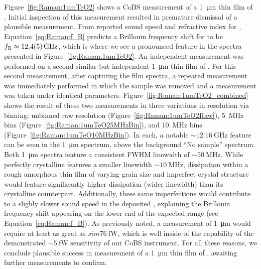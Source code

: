Figure~\ref{fig:Raman:1umTeO2} shows a \ac{CoBS} measurement of a \SI{1}{\micro\meter} thin film of . Initial inspection of this measurement resulted in premature dismissal of a plausible measurement. From reported sound speed and refractive index for , \cite{uchida1969elastic, schweppe1970elastic, ohmachi1972acoustic, peercy1975temperature, fleury2018non, harris1991multichannel, uchida1971optical} Equation~\ref{eq:Raman:f_B} predicts a Brillouin frequency shift for  to be \(f_{\rm B}\approx\SI{12.4(0.5)}{\giga\hertz}\), which is where we see a pronounced feature in the spectra presented in Figure~\ref{fig:Raman:1umTeO2}. An independent measurement was performed on a second similar but independent \SI{1}{\micro\meter} thin film of . For this second measurement, after capturing the  film spectra, a repeated measurement was immediately performed in which the  sample was removed and a measurement was taken under identical parameters. Figure~\ref{fig:Raman:1umTeO2_combined} shows the result of these two measurements in three variations in resolution via binning: unbinned raw resolution (Figure~\ref{fig:Raman:1umTeO2Raw}), \SI{5}{\mega\hertz} bins (Figure~\ref{fig:Raman:1umTeO25MHzBin}), and \SI{10}{\mega\hertz} bins (Figure~\ref{fig:Raman:1umTeO10MHzBin}). In each, a notable \(\sim\SI{12.16}{\giga\hertz}\) feature can be seen in the \SI{1}{\micro\meter}  spectrum, above the background ``No sample'' spectrum. Both \SI{1}{\micro\meter}  spectra feature a consistent \ac{FWHM} linewidth of \(\sim\SI{50}{\mega\hertz}\). While perfectly crystalline  features a smaller linewidth \(\sim\SI{10}{\mega\hertz}\), \cite{renninger2018bulk} dissipation within a rough amorphous thin film of varying grain size and imperfect crystal structure would feature significantly higher dissipation (wider linewidth) than its crystalline counterpart. Additionally, these same imperfections would contribute to a slighly slower sound speed in the deposited , explaining the Brillouin frequency shift appearing on the lower end of the expected range (see Equation~\ref{eq:Raman:f_B}). As previously noted, a measurement of \SI{1}{\micro\meter}  would require at least as great as \(sim\SI{76}{\femto\watt}\), which is well inside of the capability of the demonstrated \(\sim\SI{5}{\femto\watt}\) sensitivity of our \ac{CoBS} instrument. For all these reasons, we conclude plausible success in measurement of a \SI{1}{\micro\meter} thin film of , awaiting further measurements to confirm.

